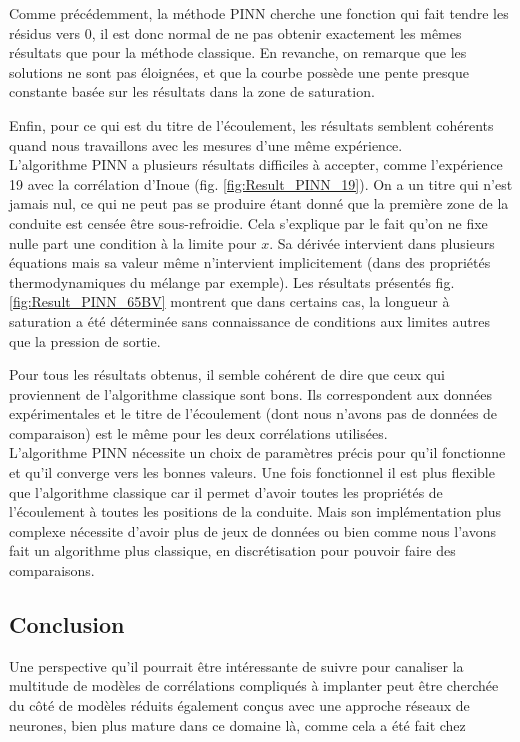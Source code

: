 Comme précédemment, la méthode PINN cherche une fonction qui fait tendre les résidus vers 0, il est donc normal de ne pas obtenir exactement les mêmes résultats que pour la méthode classique. En revanche, on remarque que les solutions ne sont pas éloignées, et que la courbe possède une pente presque constante basée sur les résultats dans la zone de saturation.\\ \par
Enfin, pour ce qui est du titre de l'écoulement, les résultats semblent cohérents quand nous travaillons avec les mesures d'une même expérience. \\

L'algorithme PINN a plusieurs résultats difficiles à accepter, comme l'expérience 19 avec la corrélation d'Inoue (fig. \ref{fig:Result_PINN_19}). On a un titre qui n'est jamais nul, ce qui ne peut pas se produire étant donné que la première zone de la conduite est censée être sous-refroidie. Cela s'explique par le fait qu'on ne fixe nulle part  une condition à la limite pour $x$. Sa dérivée intervient dans plusieurs équations mais sa valeur même n'intervient implicitement (dans des propriétés thermodynamiques du mélange par exemple). Les résultats présentés fig. \ref{fig:Result_PINN_65BV} montrent que dans certains cas, la longueur à saturation a été déterminée sans connaissance de conditions aux limites autres que la pression de sortie.\\ \par

Pour tous les résultats obtenus, il semble cohérent de dire que ceux qui proviennent de l'algorithme classique sont bons. Ils correspondent aux données expérimentales et le titre de l'écoulement (dont nous n'avons pas de données de comparaison) est le même pour les deux corrélations utilisées.\\

L'algorithme PINN nécessite un choix de paramètres précis pour qu'il fonctionne et qu'il converge vers les bonnes valeurs. Une fois fonctionnel il est plus flexible que l'algorithme classique car il permet d'avoir toutes les propriétés de l'écoulement à toutes les positions de la conduite. Mais son implémentation plus complexe nécessite d'avoir plus de jeux de données ou bien comme nous l'avons fait un algorithme plus classique, en discrétisation pour pouvoir faire des comparaisons.

\subsection{Conclusion}



Une perspective qu'il pourrait être intéressante de suivre pour canaliser la multitude de modèles de corrélations compliqués à implanter peut être cherchée du côté de modèles réduits également conçus avec une approche réseaux de neurones, bien plus mature dans ce domaine là, comme cela a été fait chez \